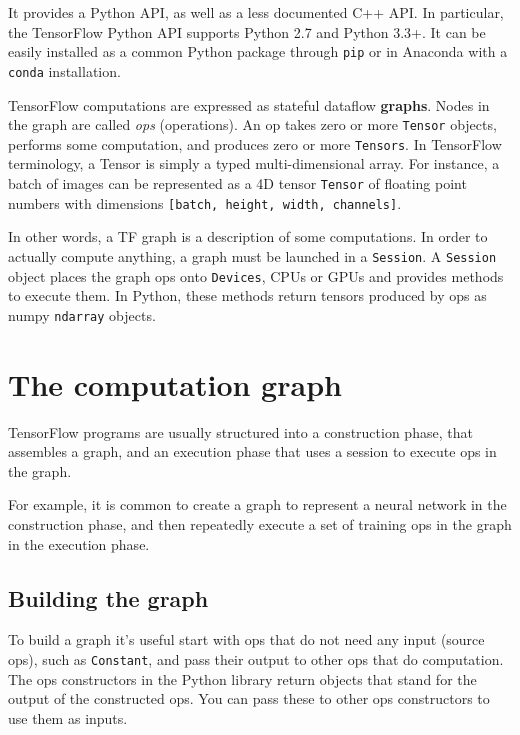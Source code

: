 It provides a Python \acs{API}, as well as a less documented C++ \acs{API}. In particular, the TensorFlow Python \acs{API} supports Python 2.7 and Python 3.3+. It can be easily installed as a common Python package through \lstinline|pip| or in Anaconda with a \lstinline|conda| installation.

TensorFlow computations are expressed as stateful dataflow \textbf{graphs}. Nodes in the graph are called \emph{ops} (\ie operations). An op takes zero or more \lstinline|Tensor| objects, performs some computation, and produces zero or more \lstinline|Tensors|. In TensorFlow terminology, a Tensor is simply a typed multi-dimensional array. For instance, a batch of images can be represented as a 4D tensor \lstinline|Tensor| of floating point numbers with dimensions \lstinline|[batch, height, width, channels]|.

In other words, a \ac{TF} graph is a description of some computations. In order to actually compute anything, a graph must be launched in a \lstinline|Session|. A \lstinline|Session| object places the graph ops onto \lstinline|Devices|, \ie \acsp{CPU} or \acsp{GPU} and provides methods to execute them. In Python, these methods return tensors produced by ops as numpy \lstinline|ndarray| objects.

\section{The computation graph}

TensorFlow programs are usually structured into a construction phase, that assembles a graph, and an execution phase that uses a session to execute ops in the graph.

For example, it is common to create a graph to represent a neural network in the construction phase, and then repeatedly execute a set of training ops in the graph in the execution phase.

\subsection{Building the graph}

To build a graph it's useful start with ops that do not need any input (source ops), such as \lstinline|Constant|, and pass their output to other ops that do computation. The ops constructors in the Python library return objects that stand for the output of the constructed ops. You can pass these to other ops constructors to use them as inputs.

